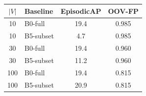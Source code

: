 \begin{tabular}{c l cc}
\toprule
$|V|$ & Baseline & EpisodicAP & OOV-FP \\
\midrule
10 & B0-full & 19.4 & 0.985 \\
10 & B5-subset & 4.7 & 0.985 \\
30 & B0-full & 19.4 & 0.960 \\
30 & B5-subset & 11.2 & 0.960 \\
100 & B0-full & 19.4 & 0.815 \\
100 & B5-subset & 20.9 & 0.815 \\
\bottomrule
\end{tabular}
